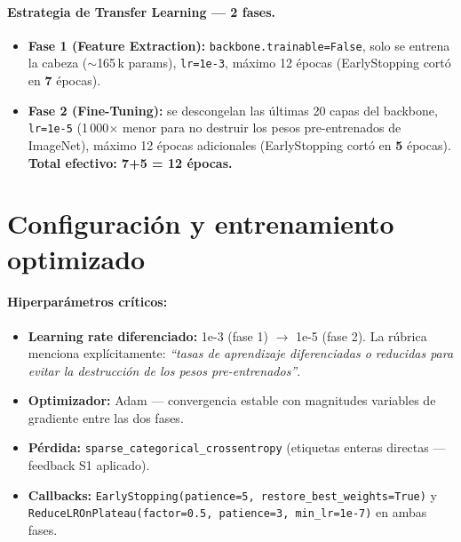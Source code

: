 \documentclass[10pt,a4paper,twocolumn]{article}
\begin{document}
\paragraph{Estrategia de Transfer Learning — 2 fases.}
\begin{itemize}
    \item \textbf{Fase 1 (Feature Extraction):} \texttt{backbone.trainable=False}, solo se entrena la cabeza ($\sim$165\,k params), \texttt{lr=1e-3}, máximo 12 épocas (EarlyStopping cortó en \textbf{7} épocas).
    \item \textbf{Fase 2 (Fine-Tuning):} se descongelan las últimas 20 capas del backbone, \texttt{lr=1e-5} (1\,000$\times$ menor para no destruir los pesos pre-entrenados de ImageNet), máximo 12 épocas adicionales (EarlyStopping cortó en \textbf{5} épocas). \textbf{Total efectivo: 7+5 = 12 épocas.}
\end{itemize}

\section{Configuración y entrenamiento optimizado}

\paragraph{Hiperparámetros críticos:}
\begin{itemize}
    \item \textbf{Learning rate diferenciado:} 1e-3 (fase 1) $\rightarrow$ 1e-5 (fase 2). La rúbrica menciona explícitamente: \textit{``tasas de aprendizaje diferenciadas o reducidas para evitar la destrucción de los pesos pre-entrenados''}.
    \item \textbf{Optimizador:} Adam — convergencia estable con magnitudes variables de gradiente entre las dos fases.
    \item \textbf{Pérdida:} \texttt{sparse\_categorical\_crossentropy} (etiquetas enteras directas — feedback S1 aplicado).
    \item \textbf{Callbacks:} \texttt{EarlyStopping(patience=5, restore\_best\_weights=True)} y \texttt{ReduceLROnPlateau(factor=0.5, patience=3, min\_lr=1e-7)} en ambas fases.
\end{itemize}

\end{document}
